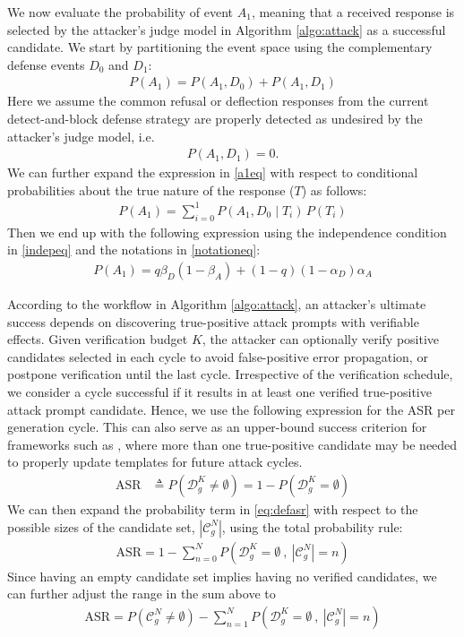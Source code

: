\documentclass[conference,compsoc]{IEEEtran}
\begin{document}
We now evaluate the probability of event $A_1$, meaning that a received response is selected by the attacker's judge model in Algorithm \ref{algo:attack} as a successful candidate. We start by partitioning the event space using the complementary defense events $D_0$ and $D_1$:
\begin{align}\label{a1eq}
    P(A_1) = P(A_1 ,D_0) + P(A_1,D_1)
\end{align}
Here we assume the common refusal or deflection responses from the current detect-and-block defense strategy are properly detected as undesired by the attacker's judge model, i.e.
\begin{align}\label{rejeq}
    P(A_1, D_1) = 0.
\end{align}
We can further expand the expression in \eqref{a1eq} with respect to conditional probabilities about the true nature of the response ($T$) as follows:
\begin{align} \label{a1prob}
    P(A_1)  = \sum_{i=0}^1 P(A_1, D_0 \mid T_i)\,P(T_i)
\end{align}
Then we end up with the following expression using the independence condition in \eqref{indepeq} and the notations in \eqref{notationeq}:
\begin{align}
    P(A_1) = q\beta_D(1-\beta_A) + (1-q)(1-\alpha_D)\alpha_A
\end{align}

According to the workflow in Algorithm \ref{algo:attack}, an attacker's ultimate success depends on discovering true-positive attack prompts with verifiable effects. Given verification budget $K$, the attacker can optionally verify positive candidates selected in each cycle to avoid false-positive error propagation, or postpone verification until the last cycle. Irrespective of the verification schedule, we consider a cycle successful if it results in at least one verified true-positive attack prompt candidate. Hence, we use the following expression for the ASR per generation cycle. This can also serve as an upper-bound success criterion for frameworks such as \cite{autodan2023, attacktree}, where more than one true-positive candidate may be needed to properly update templates for future attack cycles.
\begin{align}\label{eq:defasr}
    \mathrm{ASR} &\triangleq P(\mathcal{D}_g^K\ne \emptyset) = 1 - P(\mathcal{D}_g^K = \emptyset)
\end{align}
We can then expand the probability term in \eqref{eq:defasr} with respect to the possible sizes of the candidate set, $|\mathcal{C}_g^N|$, using the total probability rule:
\begin{align}
    \mathrm{ASR} = 1-\sum_{n=0}^N P(\mathcal{D}_g^K = \emptyset~,~|\mathcal{C}^N_g| = n)
\end{align}
Since having an empty candidate set implies having no verified candidates, we can further adjust the range in the sum above to
\begin{align}\label{eq:defasr3}
    \mathrm{ASR} = P(\mathcal{C}^N_g \ne \emptyset) - \sum_{n=1}^N P(\mathcal{D}_g^K = \emptyset~,~|\mathcal{C}^N_g| = n)
\end{align}
\end{document}

